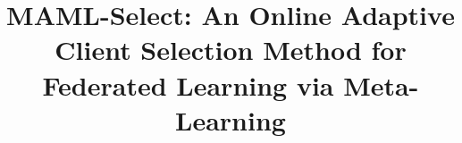 \documentclass[journal]{IEEEtran}
\theoremstyle{remark}
\begin{document}
\title{MAML-Select: An Online Adaptive Client Selection Method for Federated Learning via Meta-Learning}


\maketitle

\end{document}
